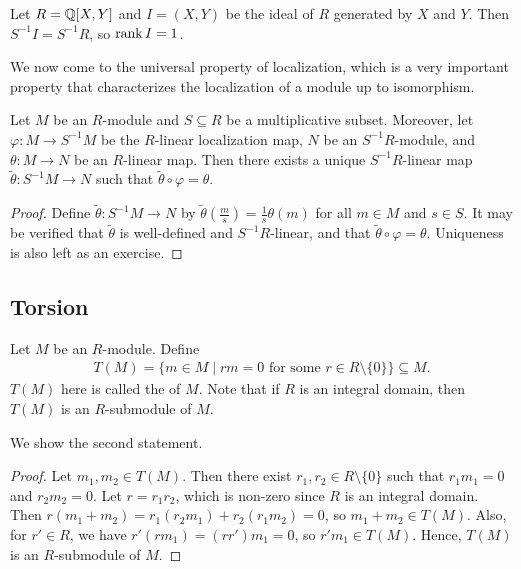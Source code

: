 \begin{example}
    Let $R = \mathbb{Q}[X,Y]$ and $I = (X,Y)$ be the ideal of $R$ generated by $X$ and $Y$. Then $S^{-1}I = S^{-1}R$, so $\operatorname{rank} I = 1$. 
\end{example}

We now come to the universal property of localization, which is a very important property that characterizes the localization of a module up to isomorphism.

\begin{theorem}
    Let $M$ be an $R$-module and $S \subseteq R$ be a multiplicative subset. Moreover, let $\varphi:M \to S^{-1}M$ be the $R$-linear localization map, $N$ be an $S^{-1}R$-module, and $\theta:M \to N$ be an $R$-linear map. Then there exists a unique $S^{-1}R$-linear map $\tilde{\theta}:S^{-1}M \to N$ such that $\tilde{\theta} \circ \varphi = \theta$.
\end{theorem}

\begin{proof}
    Define $\tilde{\theta}:S^{-1}M \to N$ by $\tilde{\theta}(\frac{m}{s}) = \frac{1}{s}\theta(m)$ for all $m \in M$ and $s \in S$. It may be verified that $\tilde{\theta}$ is well-defined and $S^{-1}R$-linear, and that $\tilde{\theta} \circ \varphi = \theta$. Uniqueness is also left as an exercise.
\end{proof}

\subsection{Torsion}

\begin{definition}
    Let $M$ be an $R$-module. Define
    \begin{align}
        T(M) = \{m \in M \mid rm = 0 \text{ for some } r \in R \setminus \{0\}\} \subseteq M.
    \end{align}
    $T(M)$ here is called the  of $M$. Note that if $R$ is an integral domain, then $T(M)$ is an $R$-submodule of $M$.
\end{definition}
We show the second statement.

\begin{proof}
    Let $m_{1},m_{2} \in T(M)$. Then there exist $r_{1},r_{2} \in R \setminus \{0\}$ such that $r_{1}m_{1} = 0$ and $r_{2}m_{2} = 0$. Let $r = r_{1}r_{2}$, which is non-zero since $R$ is an integral domain. Then $r(m_{1}+m_{2}) = r_{1}(r_{2}m_{1}) + r_{2}(r_{1}m_{2}) = 0$, so $m_{1}+m_{2} \in T(M)$. Also, for $r' \in R$, we have $r'(rm_{1}) = (rr')m_{1} = 0$, so $r'm_{1} \in T(M)$. Hence, $T(M)$ is an $R$-submodule of $M$.
\end{proof}

